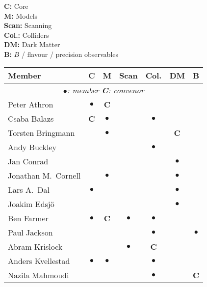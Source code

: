 \noindent\textbf{C:} Core\\
\noindent\textbf{M:} Models\\
\noindent\textbf{Scan:} Scanning\\
\noindent\textbf{Col.:} Colliders\\
\noindent\textbf{DM:} Dark Matter\\
\noindent\textbf{B:} $B$ / flavour / precision observables

\bigskip

\newcommand{\C}{\textbf{C}}            %
\newcommand{\M}{$\bullet$}             %
\newlength{\Mwidth} \settowidth{\Mwidth}{\M}
\newcommand{\E}{\makebox[\Mwidth]{}}   %
\begin{center}
\renewcommand{\arraystretch}{1.25}
\begin{tabular*}{0.99\textwidth}{@{\extracolsep{\fill}}|lcccccc|}
  \hline
  \textbf{Member} & \textbf{C}    & \textbf{M}   
                  & \textbf{Scan} & \textbf{Col.} 
                  & \textbf{DM}   & \textbf{B} \\
  \hline
  \multicolumn{7}{|c|}{\textit{\M{}: member \hspace{3em} \C{}: convenor}}\\
  Peter Athron          & \M&\C &    &    &    &    \\
  Csaba Balazs          & \C&\M &    & \M &    &    \\
  Torsten Bringmann     &   &\M &    &    & \C &    \\
  Andy Buckley          &   &   &    & \M &    &    \\
  Jan Conrad            &   &   &    &    & \M &    \\
  Jonathan M.\ Cornell  &   &\M &    &    & \M &    \\
  Lars A.\ Dal          & \M&   &    &    & \M &    \\
  Joakim Edsj\"o        &   &   &    &    & \M &    \\
  Ben Farmer            & \M&\C & \M & \M &    &    \\
  Paul Jackson          &   &   &    & \M &    & \M \\
  Abram Krislock        &   &   & \M & \C &    &    \\
  Anders Kvellestad     & \M&\M &    & \M &    &    \\
  Nazila Mahmoudi       &   &   &    & \M &    & \C \\

\end{tabular*}
\end{center}
